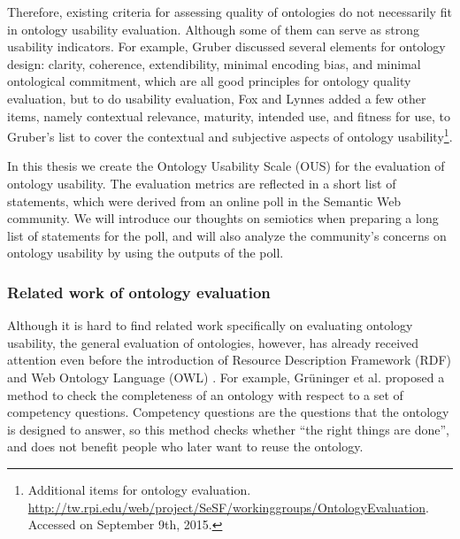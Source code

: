 Therefore, existing criteria for assessing quality of ontologies do not necessarily fit in ontology usability evaluation. Although some of them can serve as strong usability indicators. For example, Gruber \cite{gruber1995toward}
discussed several elements for ontology design: clarity, coherence, extendibility, minimal encoding bias, and minimal ontological commitment, which are all good principles for ontology quality evaluation, but to do usability evaluation, Fox and Lynnes added a few other items, namely contextual relevance, maturity, intended use, and fitness for use, to Gruber's list to cover the contextual and subjective aspects of ontology usability\footnote{Additional items for ontology evaluation. \url{http://tw.rpi.edu/web/project/SeSF/workinggroups/OntologyEvaluation}. Accessed on September 9th, 2015.}.

In this thesis we create the Ontology Usability Scale (OUS) for the evaluation of ontology usability. The evaluation metrics are reflected in a short list of statements, which were derived from an online poll in the Semantic Web community. We will introduce our thoughts on semiotics when preparing a long list of statements for the poll, and will also analyze the community's concerns on ontology usability by using the outputs of the poll.

\subsubsection{Related work of ontology evaluation}
Although it is hard to find related work specifically on evaluating ontology usability, the general evaluation of ontologies, however, has already received attention even before the introduction of Resource Description Framework (RDF) \cite{brickley2000resource} and Web Ontology Language (OWL) \cite{mcguinness2004owl}. For example, Gr{\"u}ninger et al. \cite{gruninger1995methodology} proposed a method to check the completeness of an ontology with respect to a set of competency questions. Competency questions are the questions that the ontology is designed to answer, so this method checks whether ``the right things are done'', and does not benefit people who later want to reuse the ontology.


